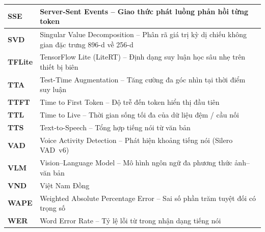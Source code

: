 \begin{longtable}{|L{3.4cm}|L{11.1cm}|}
\hline
\textbf{SSE} & Server-Sent Events -- Giao thức phát luồng phản hồi từng token \\
\hline
\textbf{SVD} & Singular Value Decomposition -- Phân rã giá trị kỳ dị chiếu không gian đặc trưng 896-d về 256-d \\
\hline
\textbf{TFLite} & TensorFlow Lite (LiteRT) -- Định dạng suy luận học sâu nhẹ trên thiết bị biên \\
\hline
\textbf{TTA} & Test-Time Augmentation -- Tăng cường đa góc nhìn tại thời điểm suy luận \\
\hline
\textbf{TTFT} & Time to First Token -- Độ trễ đến token hiển thị đầu tiên \\
\hline
\textbf{TTL} & Time to Live -- Thời gian sống tối đa của dữ liệu đệm / cầu nối \\
\hline
\textbf{TTS} & Text-to-Speech -- Tổng hợp tiếng nói từ văn bản \\
\hline
\textbf{VAD} & Voice Activity Detection -- Phát hiện khoảng tiếng nói (Silero VAD~v6) \\
\hline
\textbf{VLM} & Vision--Language Model -- Mô hình ngôn ngữ đa phương thức ảnh--văn bản \\
\hline
\textbf{VND} & Việt Nam Đồng \\
\hline
\textbf{WAPE} & Weighted Absolute Percentage Error -- Sai số phần trăm tuyệt đối có trọng số \\
\hline
\textbf{WER} & Word Error Rate -- Tỷ lệ lỗi từ trong nhận dạng tiếng nói \\
\hline
\end{longtable}
